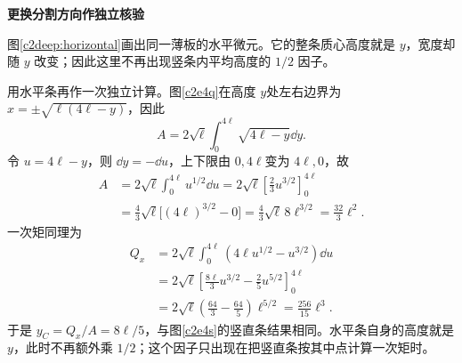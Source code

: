 \begin{solution}
\par\medskip{}\noindent\textbf{更换分割方向作独立核验}\par\nobreak
图\ref{c2deep:horizontal}画出同一薄板的水平微元。它的整条质心高度就是 $y$，宽度却随 $y$ 改变；因此这里不再出现竖条内平均高度的 $1/2$ 因子。


用水平条再作一次独立计算。图\ref{c2e4q}在高度 $y$处左右边界为 $x=\pm\sqrt{\ell(4\ell-y)}$，因此
\[A=2\sqrt\ell\int_0^{4\ell}\sqrt{4\ell-y}\dd y.
\]
令 $u=4\ell-y$，则 $\dd y=-\dd u$，上下限由 $0,4\ell$变为 $4\ell,0$，故
\begin{align*}
A&=2\sqrt\ell\int_0^{4\ell}u^{1/2}\dd u
=2\sqrt\ell\left[\frac23u^{3/2}\right]_0^{4\ell}\\
&=\frac43\sqrt\ell\bigl[(4\ell)^{3/2}-0\bigr]
=\frac43\sqrt\ell\,8\ell^{3/2}=\frac{32}3\ell^2.
\end{align*}
一次矩同理为
\begin{align*}
Q_x&=2\sqrt\ell\int_0^{4\ell}
      (4\ell u^{1/2}-u^{3/2})\dd u\\
&=2\sqrt\ell\left[\frac{8\ell}{3}u^{3/2}-\frac25u^{5/2}\right]_0^{4\ell}\\
&=2\sqrt\ell\left(\frac{64}{3}-\frac{64}{5}\right)\ell^{5/2}
=\frac{256}{15}\ell^3.
\end{align*}
于是 $y_C=Q_x/A=8\ell/5$，与图\ref{c2e4s}的竖直条结果相同。水平条自身的高度就是 $y$，此时不再额外乘 $1/2$；这个因子只出现在把竖直条按其中点计算一次矩时。


\end{solution}
